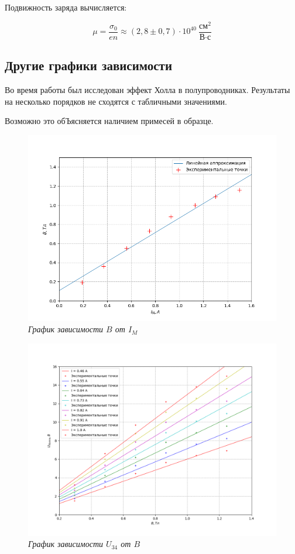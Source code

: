 \documentclass[a4paper,12pt]{article}
\begin{document}
Подвижность заряда вычисляется:

\begin{equation*}
    \mu = \frac{\sigma_0}{en} \approx (2,8 \pm 0,7) \cdot 10^{40} \ \frac{\text{см}^2}{\text{В} \cdot \text{с}} 
\end{equation*}

\subsection{Другие графики зависимости}

Во время работы был исследован эффект Холла в полупроводниках. Результаты на несколько порядков не сходятся с табличными значениями. 

Возможно это обЪясняется наличием примесей в образце.


\begin{figure}[h!]
        \centering
	\includegraphics[width=1.1\textwidth]{graph-I_M-B.png}
	\caption{\textit{График зависимости $B$ от $I_M$}}
	\label{graph:1}
\end{figure}

\begin{figure}[h!]
        \centering
	\includegraphics[width=1.1\textwidth]{graph-B-U_34.png}
	\caption{\textit{График зависимости $U_{34}$ от $B$}}
	\label{graph:2}
\end{figure}
\end{document}
